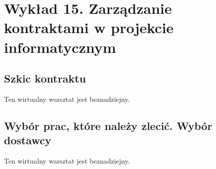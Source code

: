 \chapter{Wykład 15. Zarządzanie kontraktami w projekcie informatycznym}

\section{Szkic kontraktu}

Ten wirtualny warsztat jest beznadziejny.


\section{Wybór prac, które należy zlecić. Wybór dostawcy}

Ten wirtualny warsztat jest beznadziejny.


